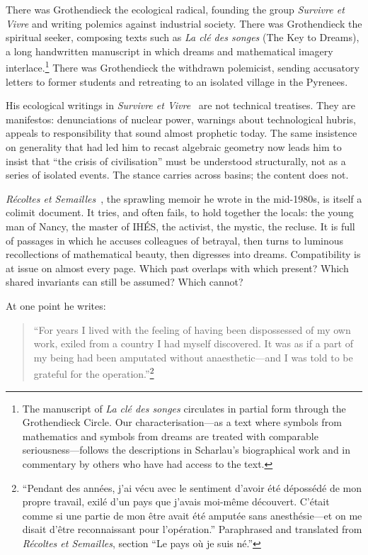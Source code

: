 \documentclass[12pt,a4paper]{article}
\begin{document}
There was Grothendieck the ecological radical, founding the group \emph{Survivre et Vivre} and writing polemics against industrial society. There was Grothendieck the spiritual seeker, composing texts such as \emph{La cl\'e des songes} (The Key to Dreams), a long handwritten manuscript in which dreams and mathematical imagery interlace.\footnote{The manuscript of \emph{La cl\'e des songes} circulates in partial form through the Grothendieck Circle. Our characterisation---as a text where symbols from mathematics and symbols from dreams are treated with comparable seriousness---follows the descriptions in Scharlau's biographical work and in commentary by others who have had access to the text.} There was Grothendieck the withdrawn polemicist, sending accusatory letters to former students and retreating to an isolated village in the Pyrenees.

His ecological writings in \emph{Survivre et Vivre}~\cite{survivre} are not technical treatises. They are manifestos: denunciations of nuclear power, warnings about technological hubris, appeals to responsibility that sound almost prophetic today. The same insistence on generality that had led him to recast algebraic geometry now leads him to insist that ``the crisis of civilisation'' must be understood structurally, not as a series of isolated events. The stance carries across basins; the content does not.

\emph{R\'ecoltes et Semailles}~\cite{grothendieck_res}, the sprawling memoir he wrote in the mid-1980s, is itself a colimit document. It tries, and often fails, to hold together the locals: the young man of Nancy, the master of IH\'ES, the activist, the mystic, the recluse. It is full of passages in which he accuses colleagues of betrayal, then turns to luminous recollections of mathematical beauty, then digresses into dreams. Compatibility is at issue on almost every page. Which past overlaps with which present? Which shared invariants can still be assumed? Which cannot?

At one point he writes:

\begin{quote}
``For years I lived with the feeling of having been dispossessed of my own work, exiled from a country I had myself discovered. It was as if a part of my being had been amputated without anaesthetic---and I was told to be grateful for the operation.''\footnote{``Pendant des ann\'ees, j'ai v\'ecu avec le sentiment d'avoir \'et\'e d\'eposs\'ed\'e de mon propre travail, exil\'e d'un pays que j'avais moi-m\^eme d\'ecouvert. C'\'etait comme si une partie de mon \^etre avait \'et\'e amput\'ee sans anesth\'esie---et on me disait d'\^etre reconnaissant pour l'op\'eration.'' Paraphrased and translated from \emph{R\'ecoltes et Semailles}, section ``Le pays o\`u je suis n\'e.''}
\end{quote}
\end{document}
